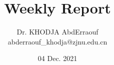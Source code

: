 \documentclass[a4paper]{article}
\title{Weekly Report}
\author{Dr. KHODJA AbdErraouf \\ abderraouf\_khodja@zjnu.edu.cn}
\date{04 Dec. 2021}
\begin{document}
\maketitle




\pagebreak


\end{document}
